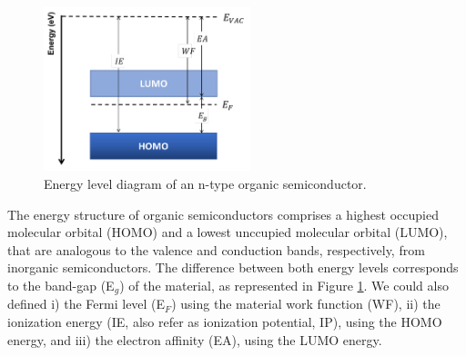 \begin{figure}[h]
  \centering
  \includegraphics[width=6cm]{Images/pdf/ediagram.pdf}
  \caption[Energy level diagram of organic semiconductors]{Energy level diagram of an n-type organic semiconductor.}
  \label{fig:ediag}
\end{figure}

The energy structure of organic semiconductors comprises a highest occupied molecular orbital (HOMO) and a lowest unccupied molecular orbital (LUMO), that are analogous to the valence and conduction bands, respectively, from inorganic semiconductors. The difference between both energy levels corresponds to the band-gap (E$_{g}$) of the material, as represented in Figure \ref{fig:ediag}. We could also defined i) the Fermi level (E$_{F}$) using the material work function (WF), ii) the ionization energy (IE, also refer as ionization potential, IP), using the HOMO energy, and iii) the electron affinity (EA), using the LUMO energy.



